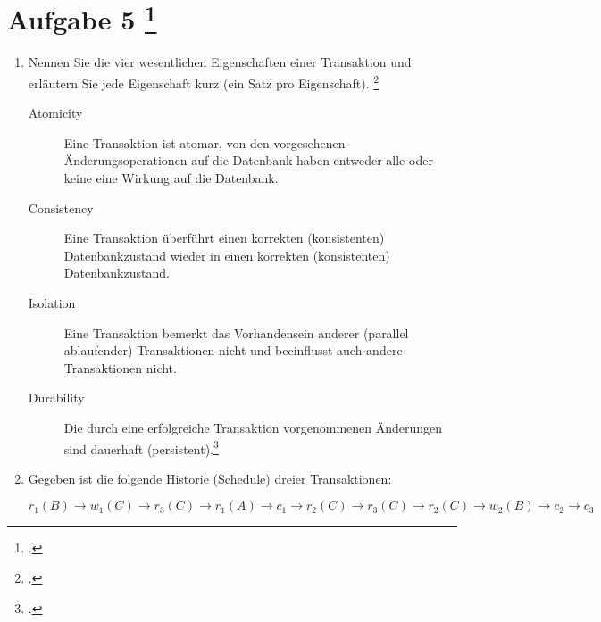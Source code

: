 \documentclass{lehramt-informatik-aufgabe}
\begin{document}

\section{Aufgabe 5
\footcite[Aufgabe 1: Transaktionen, Schedules]{db:pu:5}}

\begin{enumerate}


\item Nennen Sie die vier wesentlichen Eigenschaften einer
Transaktion und erläutern Sie jede Eigenschaft kurz (ein Satz pro
Eigenschaft).
\footcite[Thema 1 Teilaufgabe 1 Aufgabe 5]{examen:46116:2016:03}

\begin{liAntwort}
\begin{description}
\item[Atomicity]

Eine Transaktion ist atomar, \dh von den vorgesehenen
Änderungsoperationen auf die Datenbank haben entweder alle oder keine
eine Wirkung auf die Datenbank.

\item[Consistency]

Eine Transaktion überführt einen korrekten (konsistenten)
Datenbankzustand wieder in einen korrekten (konsistenten)
Datenbankzustand.

\item[Isolation]

Eine Transaktion bemerkt das Vorhandensein anderer (parallel
ablaufender) Transaktionen nicht und beeinflusst auch andere
Transaktionen nicht.

\item[Durability]

Die durch eine erfolgreiche Transaktion vorgenommenen Änderungen sind
dauerhaft (persistent).\footcite[Kapitel 9.5 „Eigenschaften von Transaktionen“, Seite 305]{kemper}
\end{description}
\end{liAntwort}


\item Gegeben ist die folgende Historie (Schedule) dreier Transaktionen:

\bigskip

$
r_1 (B) \rightarrow
w_1 (C) \rightarrow
r_3 (C) \rightarrow
r_1 (A) \rightarrow
c_1 \rightarrow
r_2 (C) \rightarrow
r_3 (C) \rightarrow
r_2 (C) \rightarrow
w_2 (B) \rightarrow
c_2 \rightarrow
c_3
$


\end{enumerate}
\end{document}
